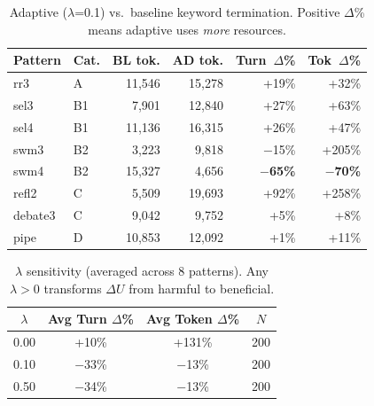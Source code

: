 \documentclass{article}
\begin{document}
\begin{table}[H]
\centering
\caption{Adaptive ($\lambda$=0.1) vs.\ baseline keyword termination. Positive $\Delta$\% means adaptive uses \emph{more} resources.}
\label{tab:adaptive}
{\small
\begin{tabular}{@{}llrrrr@{}}
\toprule
\textbf{Pattern} & \textbf{Cat.} & \textbf{BL tok.} & \textbf{AD tok.} & \textbf{Turn~$\Delta$\%} & \textbf{Tok~$\Delta$\%} \\
\midrule
rr3 & A & 11,546 & 15,278 & +19\% & +32\% \\
sel3 & B1 & 7,901 & 12,840 & +27\% & +63\% \\
sel4 & B1 & 11,136 & 16,315 & +26\% & +47\% \\
swm3 & B2 & 3,223 & 9,818 & $-$15\% & +205\% \\
swm4 & B2 & 15,327 & 4,656 & \textbf{$-$65\%} & \textbf{$-$70\%} \\
refl2 & C & 5,509 & 19,693 & +92\% & +258\% \\
debate3 & C & 9,042 & 9,752 & +5\% & +8\% \\
pipe & D & 10,853 & 12,092 & +1\% & +11\% \\
\bottomrule
\end{tabular}
}
\end{table}

\begin{table}[H]
\centering
\caption{$\lambda$ sensitivity (averaged across 8 patterns). Any $\lambda > 0$ transforms $\Delta U$ from harmful to beneficial.}
\label{tab:lambda}
{\small
\begin{tabular}{@{}cccc@{}}
\toprule
$\lambda$ & \textbf{Avg Turn $\Delta$\%} & \textbf{Avg Token $\Delta$\%} & $N$ \\
\midrule
0.00 & +10\% & +131\% & 200 \\
0.10 & $-$33\% & $-$13\% & 200 \\
0.50 & $-$34\% & $-$13\% & 200 \\
\bottomrule
\end{tabular}
}
\end{table}
\end{document}
